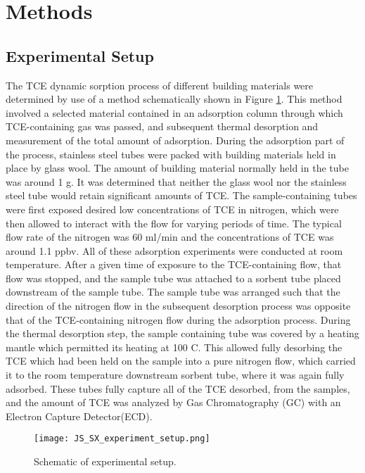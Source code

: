 \section{Methods}\label{sec:methods}

\subsection{Experimental Setup}\label{sec:experiment}

The TCE  dynamic sorption process of different building materials were determined by use of a method schematically shown in Figure \ref{fig:js_sx_setup}.
This method involved a selected material contained in an adsorption column through which TCE-containing gas was passed, and subsequent thermal desorption and measurement of the total amount of adsorption.
During the adsorption part of the process, stainless steel tubes were packed with building materials held in place by glass wool.
The amount of building material normally held in the tube was around 1 g. %
It was determined that neither the glass wool nor the stainless steel tube would retain significant amounts of TCE.
The sample-containing tubes were first exposed desired low concentrations of TCE in nitrogen, which were then allowed to interact with the flow for varying periods of time.
The typical flow rate of the nitrogen was 60 ml/min and the concentrations of TCE was around 1.1 ppbv.
All of these adsorption experiments were conducted at room temperature.
After a given time of exposure to the TCE-containing flow, that flow was stopped, and the sample tube was attached to a sorbent tube placed downstream of the sample tube.
The sample tube was arranged such that the direction of the nitrogen flow in the subsequent desorption process was opposite that of the TCE-containing nitrogen flow during the adsorption process.
During the thermal desorption step, the sample containing tube was covered by a heating mantle which permitted its heating at 100 \degree C.
This allowed fully desorbing the TCE which had been held on the sample into a pure nitrogen flow, which carried it to the room temperature downstream sorbent tube, where it was again fully adsorbed.
These tubes fully capture all of the TCE desorbed, from the samples, and the amount of TCE was analyzed by Gas Chromatography (GC) with an  Electron Capture Detector(ECD).

\begin{figure}
  \texttt{[image: JS\_SX\_experiment\_setup.png]}
  \caption{Schematic of experimental setup.} %
  \label{fig:js_sx_setup}
\end{figure}

